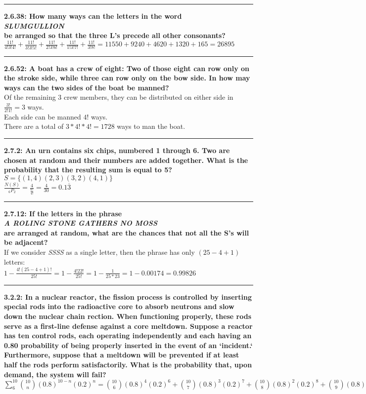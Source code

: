 \documentclass[11pt]{article}
\newcommand\question[2]{\vspace{.25in}\hrule\textbf{#1: #2}}
\begin{document}
\question{2.6.38}{How many ways can the letters in the word \\
\emph{SLUMGULLION} \\
be arranged so that the three L's precede all other consonants?}\\
$
\frac{11!}{4!3!4!} + 
\frac{11!}{3!3!5!} + 
\frac{11!}{2!3!6!} + 
\frac{11!}{1!3!7!} + 
\frac{11!}{3!8!}
=
11550 + 9240 + 4620 + 1320 + 165 = 26895
$


\question{2.6.52}{A boat has a crew of eight: Two of those eight can row only
on the stroke side, while three can row only on the bow side. In how may ways
can the two sides of the boat be manned?}\\
Of the remaining 3 crew members, they can be distributed on either side
in $\frac{3!}{2!1!}=3$ ways. \\
Each side can be manned $ 4! $ ways. \\
There are a total of $3*4!*4! = 1728$ ways to man the boat.

\question{2.7.2}{An urn contains six chips, numbered 1 through 6. Two are chosen
at random and their numbers are added together. What is the probability that the
resulting sum is equal to 5?}\\
$
S = \{
(1,4)
(2,3)
(3,2)
(4,1)
\}
$
\\
$\frac{N (S)}{_{6}P_{2}} = \frac{4}{\frac{6!}{4!}} = \frac{4}{30} = 0.1\overline{3}$


\question{2.7.12}{If the letters in the phrase \\
\emph{A ROLING STONE GATHERS NO MOSS} \\
are arranged at random, what are the chances that not all the S's will be adjacent?}\\
If we consider \emph{SSSS} as a single letter, then the phrase has only $ (25-4+1)$ letters:
\\
$
1 - \frac{4!(25-4+1)!}{25!} = 
1 - \frac{4!22!}{25!} = 
1 - \frac{1}{25*23} =
1 - 0.00174 = 0.99826
$



\question{3.2.2}{In a nuclear reactor, the fission process is controlled by 
inserting special rods into the radioactive core to absorb neutrons and slow
down the nuclear chain rection. When functioning properly, these rods serve
as a first-line defense against a core meltdown. Suppose a reactor has ten 
control rods, each operating independently and each having an 0.80 probability
of being properly inserted in the event of an `incident.` Furthermore, suppose
that a meltdown will be prevented if at least half the rods perform satisfactorily.
What is the probability that, upon demand, the system will fail?}
\\
$\sum_{6}^{10} \binom{10}{n}(0.8)^{10-n} (0.2)^{n} = 
\binom{10}{6}(0.8)^{4} (0.2)^{6} + 
\binom{10}{7}(0.8)^{3} (0.2)^{7} + 
\binom{10}{8}(0.8)^{2} (0.2)^{8} + 
\binom{10}{9}(0.8)^{1} (0.2)^{9} + 
\binom{10}{10}(0.8)^{0} (0.2)^{10} =
0.006369
$
\\
\end{document}
